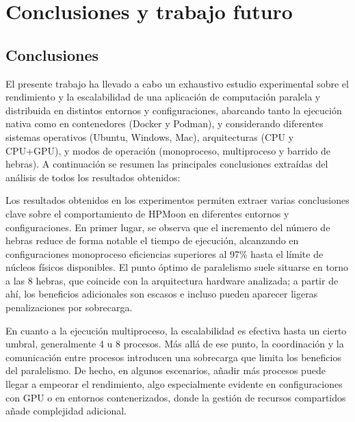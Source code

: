 \chapter{Conclusiones y trabajo futuro}\label{cap:conclusiones}


\section{Conclusiones}


El presente trabajo ha llevado a cabo un exhaustivo estudio experimental sobre el rendimiento y la escalabilidad de una aplicación de computación paralela y distribuida en distintos entornos y configuraciones, abarcando tanto la ejecución nativa como en contenedores (Docker y Podman), y considerando diferentes sistemas operativos (Ubuntu, Windows, Mac), arquitecturas (CPU y CPU+GPU), y modos de operación (monoproceso, multiproceso y barrido de hebras). A continuación se resumen las principales conclusiones extraídas del análisis de todos los resultados obtenidos:

Los resultados obtenidos en los experimentos permiten extraer varias conclusiones clave sobre el comportamiento de HPMoon en diferentes entornos y configuraciones. En primer lugar, se observa que el incremento del número de hebras reduce de forma notable el tiempo de ejecución, alcanzando en configuraciones monoproceso eficiencias superiores al 97\% hasta el límite de núcleos físicos disponibles. El punto óptimo de paralelismo suele situarse en torno a las 8 hebras, que coincide con la arquitectura hardware analizada; a partir de ahí, los beneficios adicionales son escasos e incluso pueden aparecer ligeras penalizaciones por sobrecarga.

En cuanto a la ejecución multiproceso, la escalabilidad es efectiva hasta un cierto umbral, generalmente 4 u 8 procesos. Más allá de ese punto, la coordinación y la comunicación entre procesos introducen una sobrecarga que limita los beneficios del paralelismo. De hecho, en algunos escenarios, añadir más procesos puede llegar a empeorar el rendimiento, algo especialmente evidente en configuraciones con GPU o en entornos contenerizados, donde la gestión de recursos compartidos añade complejidad adicional.

